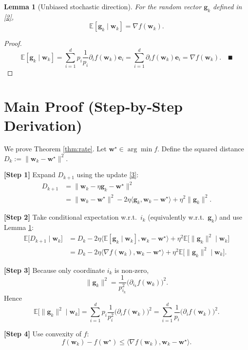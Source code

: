 \documentclass{article}
\newtheorem{lemma}{Lemma}
\newcommand{\E}{\mathbb{E}}
\newcommand{\grad}{\nabla}
\newcommand{\e}{\mathbf{e}}
\newcommand{\w}{\mathbf{w}}
\newcommand{\g}{\mathbf{g}}
\begin{document}
\begin{lemma}[Unbiased stochastic direction]\label{lem:unbiased}
For the random vector $\g_{k}$ defined in \eqref{2},
\[
\E[\g_{k}\mid\w_{k}]=\grad f(\w_{k}).
\tag{6}
\]
\end{lemma}
\begin{proof}
\[
\E[\g_{k}\mid\w_{k}]
= \sum_{i=1}^{d}p_{i}\frac{1}{p_{i}}\partial_{i}f(\w_{k})\e_{i}
= \sum_{i=1}^{d}\partial_{i}f(\w_{k})\e_{i}
= \grad f(\w_{k}).\quad\text{∎}
\]
\end{proof}

\section*{Main Proof (Step‑by‑Step Derivation)}
We prove Theorem \ref{thm:rate}. Let $\w^{\star}\in\arg\min f$.  
Define the squared distance $D_{k}:=\|\w_{k}-\w^{\star}\|^{2}$.

\noindent\textbf{[Step 1]} Expand $D_{k+1}$ using the update \eqref{3}:
\[
\begin{aligned}
D_{k+1}
&= \bigl\|\w_{k}-\eta\g_{k}-\w^{\star}\bigr\|^{2}\\
&= \|\w_{k}-\w^{\star}\|^{2}
   -2\eta\langle\g_{k},\w_{k}-\w^{\star}\rangle
   +\eta^{2}\|\g_{k}\|^{2}.
\end{aligned}
\tag{7}
\]

\noindent\textbf{[Step 2]} Take conditional expectation w.r.t.\ $i_{k}$ (equivalently w.r.t.\ $\g_{k}$) and use Lemma \ref{lem:unbiased}:
\[
\begin{aligned}
\E\!\bigl[D_{k+1}\mid\w_{k}\bigr]
&= D_{k}
   -2\eta\bigl\langle \E[\g_{k}\mid\w_{k}],\w_{k}-\w^{\star}\bigr\rangle
   +\eta^{2}\E\!\bigl[\|\g_{k}\|^{2}\mid\w_{k}\bigr] \\
&= D_{k}
   -2\eta\langle\grad f(\w_{k}),\w_{k}-\w^{\star}\rangle
   +\eta^{2}\E\!\bigl[\|\g_{k}\|^{2}\mid\w_{k}\bigr].
\end{aligned}
\tag{8}
\]

\noindent\textbf{[Step 3]} Because only coordinate $i_{k}$ is non‑zero,
\[
\|\g_{k}\|^{2}
= \frac{1}{p_{i_{k}}^{2}}\bigl(\partial_{i_{k}}f(\w_{k})\bigr)^{2}.
\]
Hence
\[
\E\!\bigl[\|\g_{k}\|^{2}\mid\w_{k}\bigr]
= \sum_{i=1}^{d}p_{i}\frac{1}{p_{i}^{2}}\bigl(\partial_{i}f(\w_{k})\bigr)^{2}
= \sum_{i=1}^{d}\frac{1}{p_{i}}\bigl(\partial_{i}f(\w_{k})\bigr)^{2}.
\tag{9}
\]

\noindent\textbf{[Step 4]} Use convexity of $f$:
\[
f(\w_{k})-f(\w^{\star})\le \langle\grad f(\w_{k}),\w_{k}-\w^{\star}\rangle .
\tag{10}
\]
\end{document}
